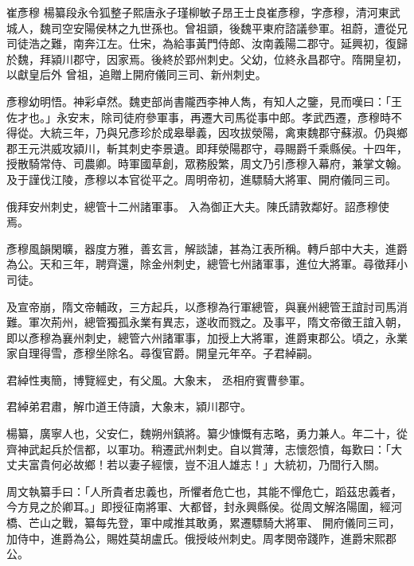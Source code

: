 
\begin{pinyinscope}

 崔彥穆
 楊纂段永令狐整子熙唐永子瑾柳敏子昂王士良崔彥穆，字彥穆，清河東武城人，魏司空安陽侯林之九世孫也。曾祖顗，後魏平東府諮議參軍。祖蔚，遭從兄司徒浩之難，南奔江左。仕宋，為給事黃門侍郎、汝南義陽二郡守。延興初，復歸於魏，拜潁川郡守，因家焉。後終於郢州刺史。父幼，位終永昌郡守。隋開皇初，以獻皇后外
 曾祖，追贈上開府儀同三司、新州刺史。



 彥穆幼明悟。神彩卓然。魏吏部尚書隴西李神人雋，有知人之鑒，見而嘆曰：「王佐才也。」永安末，除司徒府參軍事，再遷大司馬從事中郎。孝武西遷，彥穆時不得從。大統三年，乃與兄彥珍於成皋舉義，因攻拔滎陽，禽東魏郡守蘇淑。仍與鄉郡王元洪威攻潁川，斬其刺史李景遺。即拜滎陽郡守，尋賜爵千乘縣侯。十四年，授散騎常侍、司農卿。時軍國草創，眾務殷繁，周文乃引彥穆入幕府，兼掌文翰。及于謹伐江陵，彥穆以本官從平之。周明帝初，進驃騎大將軍、開府儀同三司。



 俄拜安州刺史，總管十二州諸軍事。
 入為御正大夫。陳氏請敦鄰好。詔彥穆使焉。



 彥穆風韻閑曠，器度方雅，善玄言，解談謔，甚為江表所稱。轉戶部中大夫，進爵為公。天和三年，聘齊還，除金州刺史，總管七州諸軍事，進位大將軍。尋徵拜小司徒。



 及宣帝崩，隋文帝輔政，三方起兵，以彥穆為行軍總管，與襄州總管王誼討司馬消難。軍次荊州，總管獨孤永業有異志，遂收而戮之。及事平，隋文帝徵王誼入朝，即以彥穆為襄州刺史，總管六州諸軍事，加授上大將軍，進爵東郡公。頃之，永業家自理得雪，彥穆坐除名。尋復官爵。開皇元年卒。子君綽嗣。



 君綽性夷簡，博覽經史，有父風。大象末，
 丞相府賓曹參軍。



 君綽弟君肅，解巾道王侍讀，大象末，潁川郡守。



 楊纂，廣寧人也，父安仁，魏朔州鎮將。纂少慷慨有志略，勇力兼人。年二十，從齊神武起兵於信都，以軍功。稍遷武州刺史。自以賞薄，志懷怨憤，每歎曰：「大丈夫富貴何必故鄉！若以妻子經懷，豈不沮人雄志！」大統初，乃間行入關。



 周文執纂手曰：「人所貴者忠義也，所懼者危亡也，其能不憚危亡，蹈茲忠義者，今方見之於卿耳。」即授征南將軍、大都督，封永興縣侯。從周文解洛陽圍，經河橋、芒山之戰，纂每先登，軍中咸推其敢勇，累遷驃騎大將軍、
 開府儀同三司，加侍中，進爵為公，賜姓莫胡盧氏。俄授岐州刺史。周孝閔帝踐阼，進爵宋熙郡公。




\end{pinyinscope}
